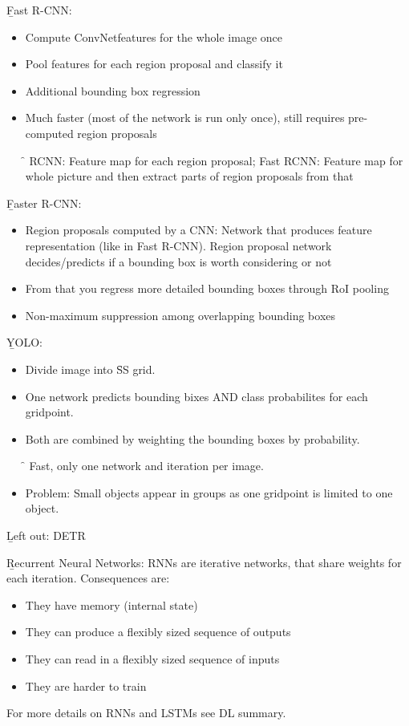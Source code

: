 \vspace{0.5em}
\b{Fast R-CNN:}
\begin{itemize}
    \item Compute ConvNetfeatures for the whole image once
    \item Pool features for each region proposal and classify it
    \item Additional bounding box regression
    \item Much faster (most of the network is run only once), still requires pre-computed region proposals
    \item[\f{\to}] RCNN: Feature map for each region proposal; Fast RCNN: Feature map for whole picture and then extract parts of region proposals from that
\end{itemize}
\vspace{0.5em}
\b{Faster R-CNN:}
\begin{itemize}
    \item Region proposals computed by a CNN: Network that produces feature representation (like in Fast R-CNN). Region proposal network decides/predicts if a bounding box is worth considering or not
    \item From that you regress more detailed bounding boxes through RoI pooling
    \item Non-maximum suppression among overlapping bounding boxes
\end{itemize}
\vspace{0.5em}
\b{YOLO:}
\begin{itemize}
    \item Divide image into \f{S\times S} grid.
    \item One network predicts bounding bixes AND class probabilites for each gridpoint.
    \item Both are combined by weighting the bounding boxes by probability.
    \item[\f{\to}] Fast, only one network and iteration per image.
    \item Problem: Small objects appear in groups as one gridpoint is limited to one object.
\end{itemize}
\vspace{0.5em}
\b{Left out: DETR\\}\newpage

\b{Recurrent Neural Networks:}
RNNs are iterative networks, that share weights for each iteration. Consequences are:
\begin{itemize}
    \item They have memory (internal state)
    \item They can produce a flexibly sized sequence of outputs
    \item They can read in a flexibly sized sequence of inputs
    \item They are harder to train
\end{itemize}
For more details on RNNs and LSTMs see DL summary.\\

